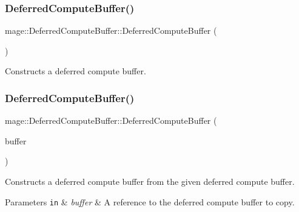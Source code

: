 \subsubsection{\texorpdfstring{Deferred\+Compute\+Buffer()}{DeferredComputeBuffer()}\hspace{0.1cm}{\footnotesize\ttfamily [1/3]}}
{\footnotesize\ttfamily mage\+::\+Deferred\+Compute\+Buffer\+::\+Deferred\+Compute\+Buffer (\begin{DoxyParamCaption}{ }\end{DoxyParamCaption})}

Constructs a deferred compute buffer. \hypertarget{structmage_1_1_deferred_compute_buffer_a95255bfbcf43f16fc7f6fac75ef293f4}{}\label{structmage_1_1_deferred_compute_buffer_a95255bfbcf43f16fc7f6fac75ef293f4} 
\subsubsection{\texorpdfstring{Deferred\+Compute\+Buffer()}{DeferredComputeBuffer()}\hspace{0.1cm}{\footnotesize\ttfamily [2/3]}}
{\footnotesize\ttfamily mage\+::\+Deferred\+Compute\+Buffer\+::\+Deferred\+Compute\+Buffer (\begin{DoxyParamCaption}\item[{const \hyperlink{structmage_1_1_deferred_compute_buffer}{Deferred\+Compute\+Buffer} \&}]{buffer }\end{DoxyParamCaption})\hspace{0.3cm}{\ttfamily [default]}}

Constructs a deferred compute buffer from the given deferred compute buffer.


\begin{DoxyParams}[1]{Parameters}
\mbox{\tt in}  & {\em buffer} & A reference to the deferred compute buffer to copy. \\
\hline
\end{DoxyParams}
\hypertarget{structmage_1_1_deferred_compute_buffer_ab607d7a0f46a321f0693c19913b8bb0d}{}\label{structmage_1_1_deferred_compute_buffer_ab607d7a0f46a321f0693c19913b8bb0d} 
